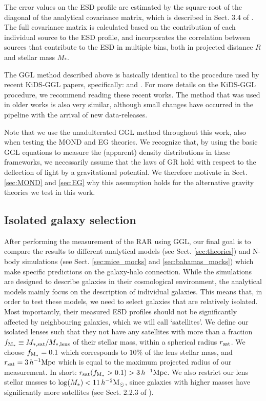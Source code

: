 \documentclass[usenatbib]{mnras}
\newcommand{\hmsun}{\,h^{-2} {\rm M_\odot}}
\newcommand{\hMpc}{\, h^{-1}{\rm{Mpc}} }
\newcommand{\un}[1]{_{\rm #1}}
\begin{document}
The error values on the ESD profile are estimated by the square-root of the diagonal of the analytical covariance matrix, which is described in Sect. 3.4 of \cite{viola2015}. The full covariance matrix is calculated based on the contribution of each individual source to the ESD profile, and incorporates the correlation between sources that contribute to the ESD in multiple bins, both in projected distance $R$ and stellar mass $M_*$.

The GGL method described above is basically identical to the procedure used by recent KiDS-GGL papers, specifically: \cite{dvornik2017,dvornik2018} and \cite{brouwer2017,brouwer2018}. For more details on the KiDS-GGL procedure, we recommend reading these recent works. The method that was used in older works \cite[]{viola2015,sifon2015,uitert2016,brouwer2016} is also very similar, although small changes have occurred in the pipeline with the arrival of new data-releases.

Note that we use the unadulterated GGL method throughout this work, also when testing the MOND and EG theories. We recognize that, by using the basic GGL equations to measure the (apparent) density distributions in these frameworks, we necessarily assume that the laws of GR hold with respect to the deflection of light by a gravitational potential. We therefore motivate in Sect. \ref{sec:MOND} and \ref{sec:EG} why this assumption holds for the alternative gravity theories we test in this work.


\subsection{Isolated galaxy selection}
\label{sec:isolation}

After performing the measurement of the RAR using GGL, our final goal is to compare the results to different analytical models (see Sect. \ref{sec:theories}) and N-body simulations (see Sect. \ref{sec:mice_mocks} and \ref{sec:bahamas_mocks}) which make specific predictions on the galaxy-halo connection. While the simulations are designed to describe galaxies in their cosmological environment, the analytical models mainly focus on the description of individual galaxies. This means that, in order to test these models, we need to select galaxies that are relatively isolated. Most importantly, their measured ESD profiles should not be significantly affected by neighbouring galaxies, which we will call `satellites'. We define our isolated lenses such that they not have any satellites with more than a fraction $f\un{M_*} \equiv M\un{*,sat}/M\un{*,lens}$ of their stellar mass, within a spherical radius $r\un{sat}$. We choose $f\un{M_*}=0.1$ which corresponds to $10\%$ of the lens stellar mass, and $r\un{sat}=3\hMpc$ which is equal to the maximum projected radius of our measurement. In short: $r\un{sat}(f\un{M_*}>0.1)>3\hMpc$. We also restrict our lens stellar masses to $\log(M_*)<11 \hmsun$, since galaxies with higher masses have significantly more satellites (see Sect. 2.2.3 of \citealp{brouwer2017}).
\end{document}
